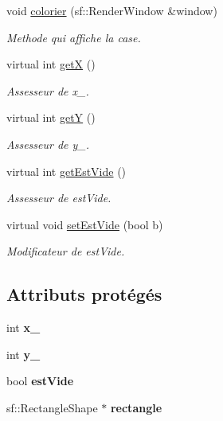\begin{DoxyCompactItemize}
\item 
void \hyperlink{classCase_ad7cbf9289ac69b4e1c1f3fc20a6fa540}{colorier} (sf\-::\-Render\-Window \&window)
\begin{DoxyCompactList}\small\item\em \-Methode qui affiche la case. \end{DoxyCompactList}\item 
virtual int \hyperlink{classCase_ab5580b919199dd2ec379672d3390bbff}{get\-X} ()
\begin{DoxyCompactList}\small\item\em \-Assesseur de x\-\_\-. \end{DoxyCompactList}\item 
virtual int \hyperlink{classCase_a824f612c5a660a1d55ac06931747c46d}{get\-Y} ()
\begin{DoxyCompactList}\small\item\em \-Assesseur de y\-\_\-. \end{DoxyCompactList}\item 
virtual int \hyperlink{classCase_a80ae0e9d1a9c575bee4c8a7b984deb59}{get\-Est\-Vide} ()
\begin{DoxyCompactList}\small\item\em \-Assesseur de est\-Vide. \end{DoxyCompactList}\item 
\hypertarget{classCase_a292e07394ff0a1c31ebf35940c91f29d}{virtual void \hyperlink{classCase_a292e07394ff0a1c31ebf35940c91f29d}{set\-Est\-Vide} (bool b)}\label{classCase_a292e07394ff0a1c31ebf35940c91f29d}

\begin{DoxyCompactList}\small\item\em \-Modificateur de est\-Vide. \end{DoxyCompactList}\end{DoxyCompactItemize}
\subsection*{\-Attributs protégés}
\begin{DoxyCompactItemize}
\item 
\hypertarget{classCase_a45ecd9780447322263846abde6b5dfb8}{int {\bfseries x\-\_\-}}\label{classCase_a45ecd9780447322263846abde6b5dfb8}

\item 
\hypertarget{classCase_a44d580d307f1bacd6e68fc1384afc296}{int {\bfseries y\-\_\-}}\label{classCase_a44d580d307f1bacd6e68fc1384afc296}

\item 
\hypertarget{classCase_a8a42e3989f79ab7f95635d59e7c20ba5}{bool {\bfseries est\-Vide}}\label{classCase_a8a42e3989f79ab7f95635d59e7c20ba5}

\item 
\hypertarget{classCase_a09b40766357ec483aa249103c35eaf81}{sf\-::\-Rectangle\-Shape $\ast$ {\bfseries rectangle}}\label{classCase_a09b40766357ec483aa249103c35eaf81}

\end{DoxyCompactItemize}
